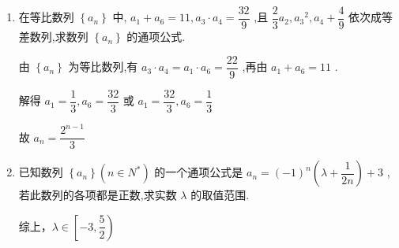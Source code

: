 \begin{enumerate}
\begin{jieda}
        可得 $ {a}_{4}^{3} + 2{a}_{4} - {12} = 0 $ 解得 $ {a}_{4} = 2 $ .
        故中间项 $ {a}_{4} = 2 $ .
    \end{jieda}

    \item 在等比数列 $ \left\{  {a}_{n}\right\} $ 中, $ {a}_{1} + {a}_{6} = {11},{a}_{3} \cdot  {a}_{4} = \dfrac{32}{9} $ ,且 $ \dfrac{2}{3}{a}_{2},{a}_{3}{}^{2},{a}_{4} + \dfrac{4}{9} $ 依次成等差数列,求数列 $ \left\{  {a}_{n}\right\} $ 的通项公式.

    \begin{jieda}
        由 $ \left\{  {a}_{n}\right\} $ 为等比数列,有 $ {a}_{3} \cdot  {a}_{4} = {a}_{1} \cdot  {a}_{6} = \dfrac{22}{9} $ ,再由 $ {a}_{1} + {a}_{6} = {11} $ .
        
        解得 $ {a}_1 = \dfrac{1}{3}, {a}_6 = \dfrac{32}{3} $ 或 ${a}_{1} = \dfrac{32}{3}, a_6 = \dfrac{1}{3}$

        故 $ {a}_{n} = \dfrac{{2}^{n - 1}}{3} $
    \end{jieda}

    
    \item 已知数列 $\left\{  {a}_{n}\right\}  \left( {n \in  {N}^{ * }}\right)$ 的一个通项公式是 ${a}_{n} = {\left( -1\right) }^{n}\left( {\lambda  + \dfrac{1}{2n}}\right)  + 3$ ,若此数列的各项都是正数,求实数 $\lambda$ 的取值范围.
    \begin{jieda}
        综上，$\lambda \in \left[-3, \dfrac{5}{2}\right)$
    \end{jieda}


\end{enumerate}
